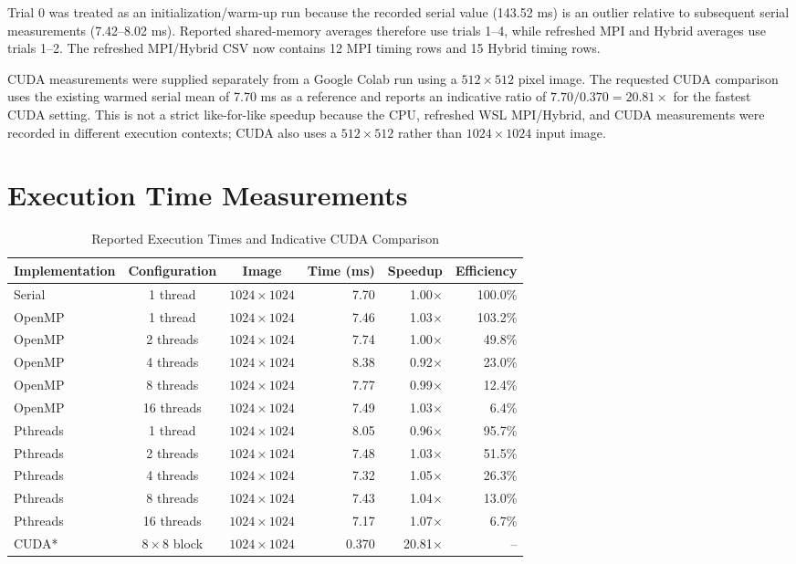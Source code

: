 \documentclass[12pt,a4paper]{report}
\begin{document}
Trial 0 was treated as an initialization/warm-up run because the recorded serial value
(143.52 ms) is an outlier relative to subsequent serial measurements (7.42--8.02 ms).
Reported shared-memory averages therefore use trials 1--4, while refreshed MPI and Hybrid
averages use trials 1--2. The refreshed MPI/Hybrid CSV now contains 12 MPI timing rows and
15 Hybrid timing rows.

CUDA measurements were supplied separately from a Google Colab run using a $512 \times 512$
pixel image. The requested CUDA comparison uses the existing warmed serial mean of 7.70 ms
as a reference and reports an indicative ratio of $7.70 / 0.370 = 20.81\times$ for the
fastest CUDA setting. This is not a strict like-for-like speedup because the CPU, refreshed
WSL MPI/Hybrid, and CUDA measurements were recorded in different execution contexts; CUDA
also uses a $512 \times 512$ rather than $1024 \times 1024$ input image.

\section{Execution Time Measurements}

\begin{table}[H]
    \centering
    \scriptsize
    \begin{tabular}{|l|c|c|r|r|r|}
    \hline
    \textbf{Implementation} & \textbf{Configuration} & \textbf{Image} & \textbf{Time (ms)} & \textbf{Speedup} & \textbf{Efficiency} \\
    \hline
    Serial & 1 thread & $1024 \times 1024$ & 7.70 & 1.00$\times$ & 100.0\% \\
    \hline
    OpenMP & 1 thread & $1024 \times 1024$ & 7.46 & 1.03$\times$ & 103.2\% \\
    OpenMP & 2 threads & $1024 \times 1024$ & 7.74 & 1.00$\times$ & 49.8\% \\
    OpenMP & 4 threads & $1024 \times 1024$ & 8.38 & 0.92$\times$ & 23.0\% \\
    OpenMP & 8 threads & $1024 \times 1024$ & 7.77 & 0.99$\times$ & 12.4\% \\
    OpenMP & 16 threads & $1024 \times 1024$ & 7.49 & 1.03$\times$ & 6.4\% \\
    \hline
    Pthreads & 1 thread & $1024 \times 1024$ & 8.05 & 0.96$\times$ & 95.7\% \\
    Pthreads & 2 threads & $1024 \times 1024$ & 7.48 & 1.03$\times$ & 51.5\% \\
    Pthreads & 4 threads & $1024 \times 1024$ & 7.32 & 1.05$\times$ & 26.3\% \\
    Pthreads & 8 threads & $1024 \times 1024$ & 7.43 & 1.04$\times$ & 13.0\% \\
    Pthreads & 16 threads & $1024 \times 1024$ & 7.17 & 1.07$\times$ & 6.7\% \\
    \hline
    CUDA* & $8 \times 8$ block & $1024 \times 1024$ & 0.370 & 20.81$\times$ & -- \\
    \hline
    \end{tabular}
    \caption{Reported Execution Times and Indicative CUDA Comparison}
\end{table}
\end{document}
